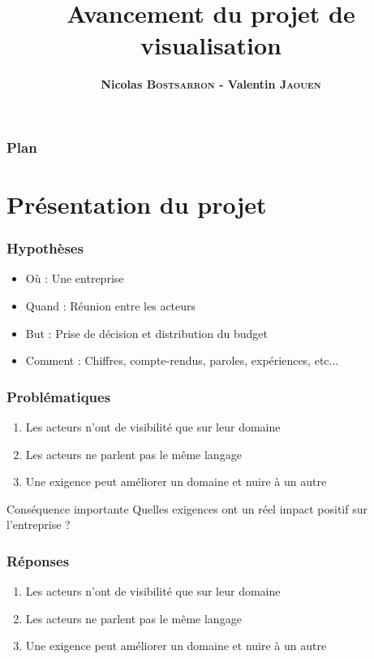 \documentclass{beamer}
\title[Avancement]{Avancement du projet de visualisation}
\author{\textbf{Nicolas \textsc{Bostsarron} - Valentin \textsc{Jaouen}}}
\institute{Centrale Supélec - Campus de Rennes}
\begin{document}
  \begin{frame}
    \titlepage
  \end{frame}
  
  \begin{frame}
    \frametitle{Plan}
    \tableofcontents
  \end{frame} 

  \section{Présentation du projet}
  \begin{frame}
    \frametitle{Hypothèses}
    \begin{itemize}
     \item Où : Une entreprise
     \item Quand : Réunion entre les acteurs
     \item But : Prise de décision et distribution du budget
     \item Comment : Chiffres, compte-rendus, paroles, expériences, etc...
    \end{itemize}
  \end{frame}
  
  \begin{frame}
   \frametitle{Problématiques}
   \begin{enumerate}   
    \item Les acteurs n'ont de visibilité que sur leur domaine
    \item Les acteurs ne parlent pas le même langage
    \item Une exigence peut améliorer un domaine et nuire à un autre
   \end{enumerate}
   \begin{alertblock}{Conséquence importante}
    Quelles exigences ont un réel impact positif sur l'entreprise ?
   \end{alertblock}
  \end{frame}

  \begin{frame}
    \frametitle{Réponses}
    \begin{enumerate}    
     \item Les acteurs n'ont de visibilité que sur leur domaine
     \item Les acteurs ne parlent pas le même langage
     \item Une exigence peut améliorer un domaine et nuire à un autre
    \end{enumerate}
  \end{frame}
  
\end{document}
